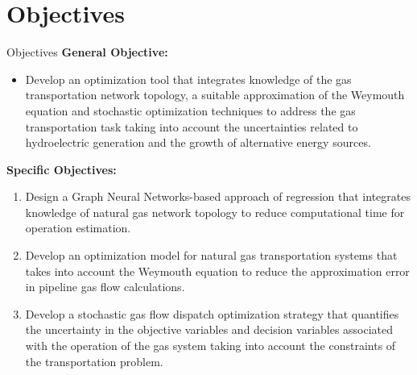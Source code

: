 \documentclass[hyperref={colorlinks,citecolor=blue,linkcolor=blue,urlcolor=blue}]{beamer}
\begin{document}
\section{Objectives}
\begin{frame}{Objectives}
\justifying
\footnotesize
\textbf{General Objective:}
\begin{itemize}
    \justifying
    \item Develop an optimization tool that integrates knowledge of the gas transportation network topology, a suitable approximation of the Weymouth equation and stochastic optimization techniques to address the gas transportation task taking into account the uncertainties related to hydroelectric generation and the growth of alternative energy sources.
\end{itemize}

    \textbf{Specific Objectives:}
\begin{enumerate}
    \footnotesize
    \item Design a Graph Neural Networks-based approach of regression that integrates knowledge of natural gas network topology to reduce computational time for operation estimation.    
    \item Develop an optimization model for natural gas transportation systems that takes into account the Weymouth equation to reduce  the approximation error in pipeline gas flow calculations.
    \item Develop a stochastic gas flow dispatch optimization strategy that quantifies the uncertainty in the objective variables and decision variables associated with the operation of the gas system taking into account the constraints of the transportation problem.
\end{enumerate}
\end{frame}
\end{document}
